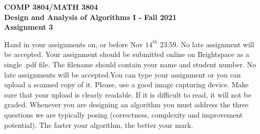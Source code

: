 \documentclass[12pt]{article}
\newcounter{ques}
\begin{document}
\begin{center} \large\bf
COMP 3804/MATH 3804\\
Design and Analysis of Algorithms I  -
Fall  2021\\
Assignment 3
\end{center}

Hand in your assignments on, or before
Nov $14^{th}$ 23:59. No late assignment will be accepted. Your assignment should be submitted online on Brightspace as a single .pdf file.  The filename should contain your name and student number. No late assignments will be accepted.You can type your assignment or you can upload a scanned copy of it.  Please, use a good image capturing device. Make sure that your upload is clearly readable. If it is difficult to read, it will not be graded. Whenever you are designing an algorithm you must address the three questions we are
typically posing (correctness, complexity and improvement potential).
The faster your
algorithm, the better your mark.     \\

\vspace{1em}
\end{document}
